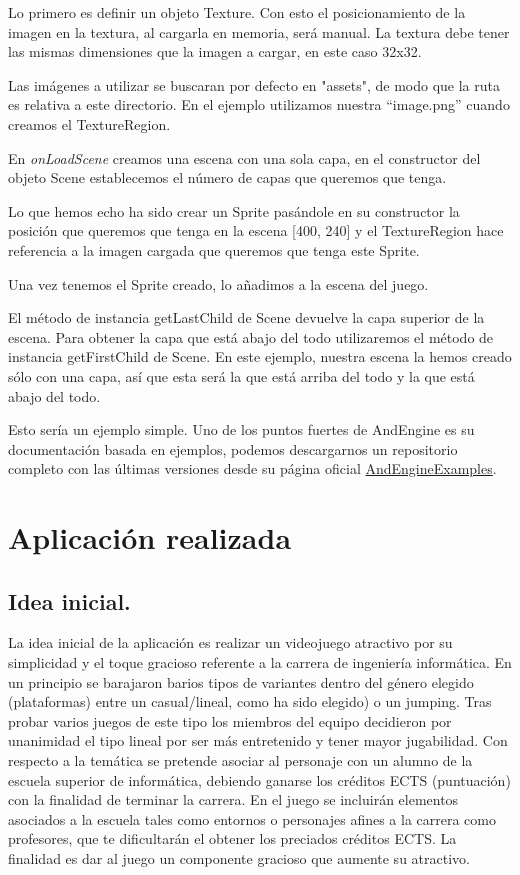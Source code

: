 \documentclass[12 pt, a4paper, twoside]{article}
\begin{document}
\clearpage
Lo primero es definir un objeto Texture. Con esto el posicionamiento
de la imagen en la textura, al cargarla en memoria, será manual.
La textura debe tener las mismas dimensiones que la imagen a cargar,
en este caso 32x32.

Las imágenes a utilizar se buscaran por defecto en "assets", de modo
que la ruta es relativa a este directorio. En el ejemplo utilizamos
nuestra ``image.png'' cuando creamos el TextureRegion.

En \emph{onLoadScene} creamos una escena con una sola capa, en el
constructor del objeto Scene establecemos el número de capas que
queremos que tenga.

Lo que hemos echo ha sido crear un Sprite pasándole en su constructor la posición que
queremos que tenga en la escena [400, 240] y el TextureRegion hace
referencia a la imagen cargada que queremos que tenga este Sprite.

Una vez tenemos el Sprite creado, lo añadimos a la escena del juego.

El método de instancia getLastChild de Scene devuelve la capa superior
de la escena. Para obtener la capa que está abajo del todo
utilizaremos el método de instancia getFirstChild de Scene. En este
ejemplo, nuestra escena la hemos creado sólo con una capa, así que
esta será la que está arriba del todo y la que está abajo del todo.

Esto sería un ejemplo simple. Uno de los puntos fuertes de AndEngine
es su documentación basada en ejemplos, podemos descargarnos un
repositorio completo con las últimas versiones desde su página oficial
\href{http://code.google.com/p/andengineexamples}{AndEngineExamples}.


\section{Aplicación realizada}%
\subsection{Idea inicial.}
La idea inicial de la aplicación es realizar un videojuego atractivo
por su simplicidad y el toque gracioso referente a la carrera de
ingeniería informática.
En un principio se barajaron barios tipos de variantes dentro del
género elegido (plataformas) entre un casual/lineal, como ha sido
elegido) o un jumping. Tras probar varios juegos de este tipo los miembros del equipo
decidieron por unanimidad el tipo lineal por ser más entretenido y
tener mayor jugabilidad.
Con respecto a la temática se pretende asociar al personaje con un
alumno de la escuela superior de informática, debiendo ganarse los
créditos ECTS (puntuación) con la finalidad de terminar la carrera. En
el juego se incluirán elementos asociados a la escuela tales
como entornos o personajes afines a la carrera como profesores, que te
dificultarán el obtener los preciados créditos ECTS. La finalidad es
dar al juego un componente gracioso que aumente su atractivo.
\end{document}
